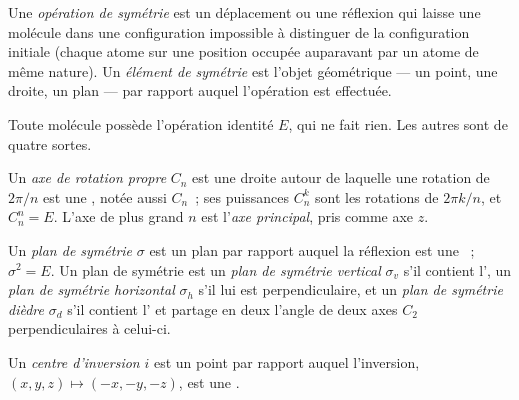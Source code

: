 \begin{definition}\label{def:b3:point-groups:operation}
Une \emph{opération de symétrie} est un déplacement ou
une réflexion qui laisse une molécule dans une configuration impossible à
distinguer de la configuration initiale (chaque atome sur une position
occupée auparavant par un atome de même nature). Un \emph{élément de
symétrie} est l'objet
géométrique --- un point, une droite, un plan --- par rapport auquel
l'opération est effectuée.
\end{definition}

Toute molécule possède l'opération identité $E$, qui ne fait rien. Les
autres sont de quatre sortes.

\begin{definition}\label{def:b3:point-groups:rotation}
Un \emph{axe de rotation propre} $C_n$ est une
droite autour de laquelle une rotation de $2\pi/n$ est une , notée aussi
$C_n$~; ses puissances $C_n^k$ sont les rotations de $2\pi k/n$, et
$C_n^n = E$. L'axe de plus grand $n$ est l'\emph{axe principal},
pris comme axe $z$.
\end{definition}

\begin{definition}\label{def:b3:point-groups:mirror}
Un \emph{plan de symétrie} $\sigma$ est un plan par rapport
auquel la réflexion est une ~; $\sigma^2 = E$. Un
plan de symétrie est un \emph{plan de symétrie vertical} $\sigma_v$ s'il
contient l', un \emph{plan de symétrie
horizontal} $\sigma_h$ s'il lui est
perpendiculaire, et un \emph{plan de symétrie dièdre}
$\sigma_d$ s'il contient l' et partage en deux l'angle de
deux axes $C_2$ perpendiculaires à celui-ci.
\end{definition}

\begin{definition}\label{def:b3:point-groups:inversion}
Un \emph{centre d'inversion} $i$ est un point
par rapport auquel l'inversion, $(x, y, z) \mapsto (-x, -y, -z)$, est une
.
\end{definition}

